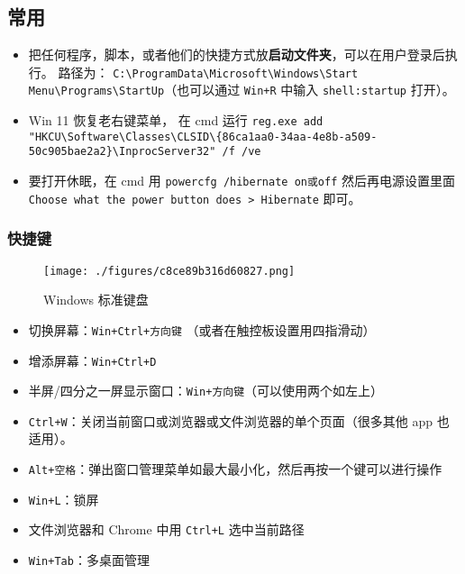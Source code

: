 
\subsection{常用}
\begin{itemize}
\item 把任何程序，脚本，或者他们的快捷方式放\textbf{启动文件夹}，可以在用户登录后执行。 路径为： \verb`C:\ProgramData\Microsoft\Windows\Start Menu\Programs\StartUp`（也可以通过 \verb`Win+R` 中输入 \verb`shell:startup` 打开）。
\item Win 11 恢复老右键菜单， 在 cmd 运行 \verb`reg.exe add "HKCU\Software\Classes\CLSID\{86ca1aa0-34aa-4e8b-a509-50c905bae2a2}\InprocServer32" /f /ve`
\item 要打开休眠，在 cmd 用 \verb`powercfg /hibernate on或off` 然后再电源设置里面 \verb`Choose what the power button does > Hibernate` 即可。
\end{itemize}

\subsubsection{快捷键}
\begin{figure}[ht]
\centering
\texttt{[image: ./figures/c8ce89b316d60827.png]}
\caption{Windows 标准键盘} \label{fig_WinNt_1}
\end{figure}

\begin{itemize}
\item 切换屏幕：\verb`Win+Ctrl+方向键` （或者在触控板设置用四指滑动）
\item 增添屏幕：\verb`Win+Ctrl+D`
\item 半屏/四分之一屏显示窗口：\verb`Win+方向键`（可以使用两个如左上）
\item \verb`Ctrl+W`：关闭当前窗口或浏览器或文件浏览器的单个页面（很多其他 app 也适用）。
\item \verb`Alt+空格`：弹出窗口管理菜单如最大最小化，然后再按一个键可以进行操作
\item \verb`Win+L`：锁屏
\item 文件浏览器和 Chrome 中用 \verb`Ctrl+L` 选中当前路径
\item \verb`Win+Tab`：多桌面管理
\end{itemize}

